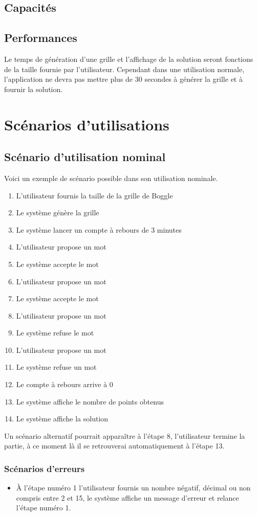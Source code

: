 \documentclass[12pt,a4paper,openany]{article}
\begin{document}
	\subsection{Capacités}
	\subsection{Performances}
	Le temps de génération d'une grille et l'affichage de la solution seront fonctions de la taille fournie par l'utilisateur. Cependant dans une
	utilisation normale, l'application ne devra pas mettre plus de 30 secondes à générer la grille et à fournir la solution.

	\section{Scénarios d'utilisations}
	\subsection{Scénario d'utilisation nominal}
	Voici un exemple de scénario possible dans son utilisation nominale.
		\begin{enumerate}
			\item L'utilisateur fournis la taille de la grille de Boggle
			\item Le système génère la grille
			\item Le système lancer un compte à rebours de 3 minutes
			\item L'utilisateur propose un mot
			\item Le système accepte le mot
			\item L'utilisateur propose un mot
			\item Le système accepte le mot
			\item L'utilisateur propose un mot
			\item Le système refuse le mot
			\item L'utilisateur propose un mot
			\item Le système refuse un mot
			\item Le compte à rebours arrive à 0
			\item Le système affiche le nombre de points obtenus
			\item Le système affiche la solution
		\end{enumerate}

		Un scénario alternatif pourrait apparaître à l'étape 8, l'utilisateur termine la partie, à ce moment là il se retrouverai automatiquement à
		l'étape 13.
	\subsubsection{Scénarios d'erreurs}
	\begin{itemize}
		\item À l'étape numéro 1 l'utilisateur fournis un nombre négatif, décimal ou non compris entre 2 et 15, le système affiche un message d'erreur
			et relance l'étape numéro 1.
	\end{itemize}
	
\end{document}
